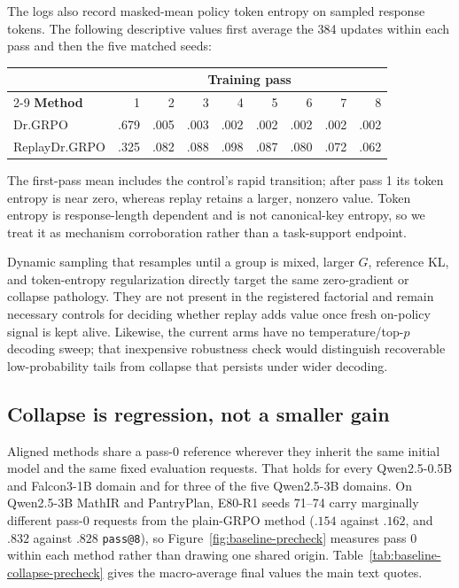 The logs also record masked-mean policy token entropy on sampled response tokens.
The following descriptive values first average the 384 updates within each pass
and then the five matched seeds:
\begin{center}
\scriptsize
\begin{tabular}{@{}lrrrrrrrr@{}}
\toprule
& \multicolumn{8}{c}{\textbf{Training pass}} \\
\cmidrule(l){2-9}
\textbf{Method} & 1 & 2 & 3 & 4 & 5 & 6 & 7 & 8 \\
\midrule
Dr.GRPO & .679 & .005 & .003 & .002 & .002 & .002 & .002 & .002 \\
ReplayDr.GRPO & .325 & .082 & .088 & .098 & .087 & .080 & .072 & .062 \\
\bottomrule
\end{tabular}
\end{center}
The first-pass mean includes the control's rapid transition; after pass 1 its
token entropy is near zero, whereas replay retains a larger, nonzero value.
Token entropy is response-length dependent and is not canonical-key entropy, so
we treat it as mechanism corroboration rather than a task-support endpoint.

Dynamic sampling that resamples until a group is mixed, larger \(G\), reference
KL, and token-entropy regularization directly target the same zero-gradient or
collapse pathology. They are not present in the registered factorial and remain
necessary controls for deciding whether replay adds value once fresh on-policy
signal is kept alive. Likewise, the current arms have no temperature/top-$p$
decoding sweep; that inexpensive robustness check would distinguish recoverable
low-probability tails from collapse that persists under wider decoding.

\subsection{Collapse is regression, not a smaller gain}
\label{app:pre-rl-regression}

Aligned methods share a pass-0 reference wherever they inherit the same initial
model and the same fixed evaluation requests. That holds for every
Qwen2.5-0.5B and Falcon3-1B domain and for three of the five Qwen2.5-3B domains.
On Qwen2.5-3B MathIR and PantryPlan, E80-R1 seeds 71--74 carry marginally
different pass-0 requests from the plain-GRPO method ($.154$ against $.162$, and
$.832$ against $.828$ \texttt{pass@8}), so
Figure~\ref{fig:baseline-precheck} measures pass 0 within each method rather than
drawing one shared origin. Table~\ref{tab:baseline-collapse-precheck} gives the
macro-average final values the main text quotes.


